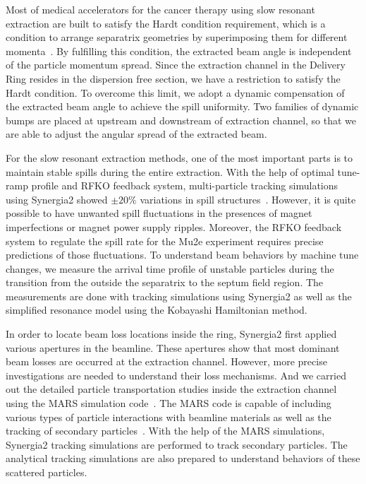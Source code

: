 \documentclass[review,1p,number,fleqn,a4paper]{elsarticle}
\begin{document}
Most of medical accelerators for the cancer therapy using slow resonant extraction are built to satisfy the Hardt condition requirement, which is a condition to arrange separatrix geometries by superimposing them for different momenta~\cite{hardt,pullia,pimms}. By fulfilling this condition, the extracted beam angle is independent of the particle momentum spread. Since the extraction channel in the Delivery Ring resides in the dispersion free section, we have a restriction to satisfy the Hardt condition. To overcome this limit, we adopt a dynamic compensation of the extracted beam angle to achieve the spill uniformity. Two families of dynamic bumps are placed at upstream and downstream of extraction channel, so that we are able to adjust the angular spread of the extracted beam.

For the slow resonant extraction methods, one of the most important parts is to maintain stable spills during the entire extraction. With the help of optimal tune-ramp profile and RFKO feedback system, multi-particle tracking simulations using Synergia2 showed \mbox{$\pm 20\%$} variations in spill structures~\cite{mu2e}. However, it is quite possible to have unwanted spill fluctuations in the presences of magnet imperfections or magnet power supply ripples. Moreover, the RFKO feedback system to regulate the spill rate for the Mu2e experiment requires precise predictions of those fluctuations. To understand beam behaviors by machine tune changes, we measure the arrival time profile of unstable particles during the transition from the outside the separatrix to the septum field region. The measurements are done with tracking simulations using Synergia2 as well as the simplified resonance model using the Kobayashi Hamiltonian method.

In order to locate beam loss locations inside the ring, Synergia2 first applied various apertures in the beamline. These apertures show that most dominant beam losses are occurred at the extraction channel. However, more precise investigations are needed to understand their loss mechanisms. And we carried out the detailed particle transportation studies inside the extraction channel using the MARS simulation code~\cite{mars1}. The MARS code is capable of including various types of particle interactions with beamline materials as well as the tracking of secondary particles~\cite{mars2}. With the help of the MARS simulations, Synergia2 tracking simulations are performed to track secondary particles. The analytical tracking simulations are also prepared to understand behaviors of these scattered particles. 
\end{document}
